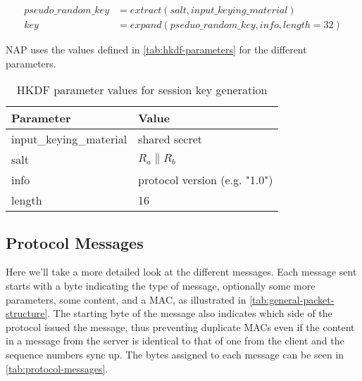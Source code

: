 \begin{equation}
    \begin{aligned}
    pseudo\_random\_key& = extract(salt, input\_keying\_material) \\
    key& = expand(pseduo\_random\_key, info, length=32)
    \end{aligned}
    \label{eq:hkdf}
\end{equation}

NAP uses the values defined in \autoref{tab:hkdf-parameters} for the different parameters.

\begin{table}[ht!]
\centering
    \begin{tabular}{| l | l |}
    \hline
    \textbf{Parameter} & \textbf{Value} \\ \hline
    input\_keying\_material & shared secret \\ \hline
    salt & \( R_a \| R_b \) \\ \hline
    info & protocol version (e.g. "1.0") \\ \hline
    length & 16 \\ \hline
    \end{tabular}
    \caption{HKDF parameter values for session key generation}\label{tab:hkdf-parameters}
\end{table}


    \subsection{Protocol Messages}\label{subsec:protocol-messages}

Here we'll take a more detailed look at the different messages. Each message sent starts with a byte indicating the type of message, optionally some more parameters, some content, and a MAC, as illustrated in \autoref{tab:general-packet-structure}. The starting byte of the message also indicates which side of the protocol issued the message, thus preventing duplicate MACs even if the content in a message from the server is identical to that of one from the client and the sequence numbers sync up. The bytes assigned to each message can be seen in \autoref{tab:protocol-messages}.

